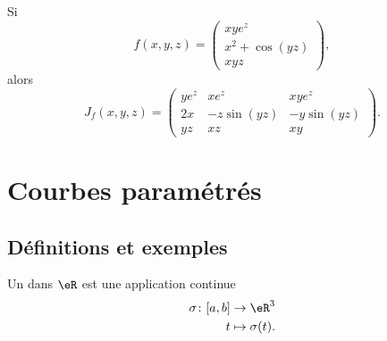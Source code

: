 \begin{example}
    Si 
    \begin{equation}
        f(x,y,z)=\begin{pmatrix}
            xy e^{z}    \\ 
            x^2+\cos(yz)    \\ 
            xyz    
        \end{pmatrix},
    \end{equation}
    alors
    \begin{equation}
        J_f(x,y,z)=\begin{pmatrix}
            ye^z    &   xe^z    &   xye^z    \\
            2x    &   -z\sin(yz)    &   -y\sin(yz)    \\
            yz    &   xz    &   xy
        \end{pmatrix}.
    \end{equation}
\end{example}

\section{Courbes paramétrés}

\subsection{Définitions et exemples}

\begin{definition}
    Un  dans $\eR$ est une application continue
    \begin{equation}
        \begin{aligned}
            \sigma\colon [a,b]&\to \eR^3 \\
            t&\mapsto \sigma(t). 
        \end{aligned}
    \end{equation}
\end{definition}

